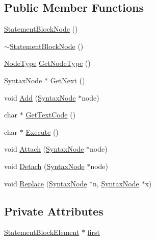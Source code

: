 \subsection*{Public Member Functions}
\begin{DoxyCompactItemize}
\item 
\hyperlink{classStatementBlockNode_ab7b27f5f9fa24acc63fd588477232c0b}{Statement\+Block\+Node} ()
\item 
\hyperlink{classStatementBlockNode_ae286ab48a4d9c273689c61a8ea80e06d}{$\sim$\+Statement\+Block\+Node} ()
\item 
\hyperlink{nodes_8h_acac9cbaeea226ed297804c012dc12b16}{Node\+Type} \hyperlink{classStatementBlockNode_ac7222752fa573a816eb2786c3f427a78}{Get\+Node\+Type} ()
\item 
\hyperlink{classSyntaxNode}{Syntax\+Node} $\ast$ \hyperlink{classStatementBlockNode_a9bf1b52dd2f683539d0fa1824be52b51}{Get\+Next} ()
\item 
void \hyperlink{classStatementBlockNode_a7cdae86c013121c1fdab0ee885c2b559}{Add} (\hyperlink{classSyntaxNode}{Syntax\+Node} $\ast$node)
\item 
char $\ast$ \hyperlink{classStatementBlockNode_a1b0102189a2ce420661be514b227ea78}{Get\+Text\+Code} ()
\item 
char $\ast$ \hyperlink{classStatementBlockNode_a820aeba99ce1f44084a3f07c734ea4a3}{Execute} ()
\item 
void \hyperlink{classStatementBlockNode_ac84d5c0d9afe4dd8c06dccd345f12310}{Attach} (\hyperlink{classSyntaxNode}{Syntax\+Node} $\ast$node)
\item 
void \hyperlink{classStatementBlockNode_a719b8e541136408805916adbb46829ad}{Detach} (\hyperlink{classSyntaxNode}{Syntax\+Node} $\ast$node)
\item 
void \hyperlink{classStatementBlockNode_ac896dd0efd4a59fca0a5d834d0e89022}{Replace} (\hyperlink{classSyntaxNode}{Syntax\+Node} $\ast$n, \hyperlink{classSyntaxNode}{Syntax\+Node} $\ast$x)
\end{DoxyCompactItemize}
\subsection*{Private Attributes}
\begin{DoxyCompactItemize}
\item 
\hyperlink{structStatementBlockElement}{Statement\+Block\+Element} $\ast$ \hyperlink{classStatementBlockNode_a3861ceb40580ec2c56870c2834c62341}{first}
\end{DoxyCompactItemize}

